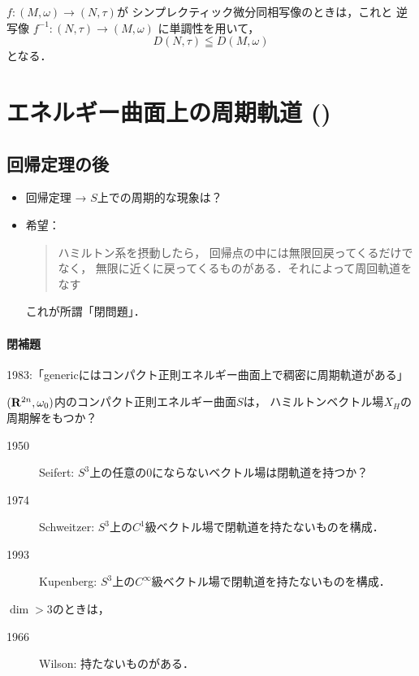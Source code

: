 \(f\colon(M,\omega)\rightarrow (N,\tau)\)が
シンプレクティック微分同相写像のときは，これと
逆写像
\(f^{-1}\colon(N,\tau)\to (M,\omega)\)
に単調性を用いて，
\[
    D(N,\tau)\leqq D(M,\omega)
\]となる．

\section{エネルギー曲面上の周期軌道 (\cite[\S1.4]{HZ94})}

\subsection*{回帰定理の後}

\begin{itemize}
    \item 回帰定理 → \(S\)上での周期的な現象は？
    \item 希望：\begin{quote}
        ハミルトン系を摂動したら，
        回帰点の中には無限回戻ってくるだけでなく，
        無限に近くに戻ってくるものがある．それによって周回軌道をなす
    \end{quote}これが所謂「閉問題」．
\end{itemize}

\paragraph{閉補題}1983:「genericにはコンパクト正則エネルギー曲面上で稠密に周期軌道がある」

\begin{Qn*}
    \((\mathbf{R}^{2n},\omega_{0})\)内のコンパクト正則エネルギー曲面\(S\)は，
    ハミルトンベクトル場\(X_H\)の周期解をもつか？
\end{Qn*}

\begin{description}
    \item[1950] Seifert: \(S^3\)上の任意の0にならないベクトル場は閉軌道を持つか？
    \item[1974] Schweitzer: \(S^3\)上の\(C^1\)級ベクトル場で閉軌道を持たないものを構成．
    \item[1993] Kupenberg: \(S^3\)上の\(C^\infty\)級ベクトル場で閉軌道を持たないものを構成．
\end{description}

\(\dim>3\)のときは，
\begin{description}
    \item[1966] Wilson: 持たないものがある．
\end{description}

